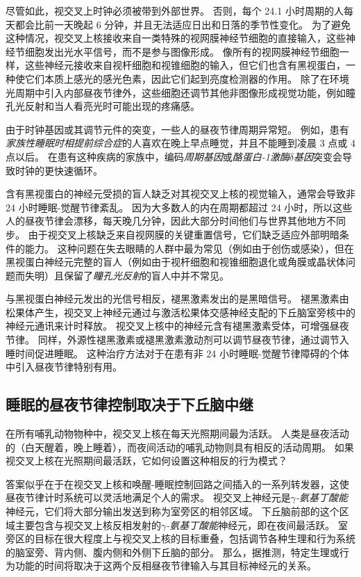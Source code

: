 尽管如此，视交叉上时钟必须被带到外部世界。
否则，每个 24.1 小时周期的人每天都会比前一天晚起 6 分钟，并且无法适应日出和日落的季节性变化。
为了避免这种情况，视交叉上核接收来自一类特殊的视网膜神经节细胞的直接输入，这些神经节细胞发出光水平信号，而不是参与图像形成。
像所有的视网膜神经节细胞一样，这些神经元接收来自视杆细胞和视锥细胞的输入，但它们也含有黑视蛋白，一种使它们本质上感光的感光色素，因此它们起到亮度检测器的作用。
除了在环境光周期中引入内部昼夜节律外，这些细胞还调节其他非图像形成视觉功能，例如瞳孔光反射和当人看亮光时可能出现的疼痛感。


由于时钟基因或其调节元件的突变，一些人的昼夜节律周期异常短。
例如，患有\textit{家族性睡眠时相提前综合症}的人喜欢在晚上早点睡觉，并且不能睡到凌晨 3 点或 4 点以后。
在患有这种疾病的家族中，编码\textit{周期基因}或\textit{酪蛋白-1激酶$\delta$基因}突变会导致时钟的更快速循环。


含有黑视蛋白的神经元受损的盲人缺乏对其视交叉上核的视觉输入，通常会导致非 24 小时睡眠-觉醒节律紊乱。
因为大多数人的内在周期都超过 24 小时，所以这些人的昼夜节律会漂移，每天晚几分钟，因此大部分时间他们与世界其他地方不同步。
由于视交叉上核缺乏来自视网膜的关键重置信号，它们缺乏适应外部明暗条件的能力。
这种问题在失去眼睛的人群中最为常见（例如由于创伤或感染），但在黑视蛋白神经元完整的盲人（例如由于视杆细胞和视锥细胞退化或角膜或晶状体问题而失明）且保留了\textit{瞳孔光反射}的盲人中并不常见。


与黑视蛋白神经元发出的光信号相反，褪黑激素发出的是黑暗信号。
褪黑激素由松果体产生，视交叉上神经元通过与激活松果体交感神经支配的下丘脑室旁核中的神经元通讯来计时释放。
视交叉上核中的神经元含有褪黑激素受体，可增强昼夜节律。
同样，外源性褪黑激素或褪黑激素激动剂可以调节昼夜节律，通过调节入睡时间促进睡眠。
这种治疗方法对于在患有非 24 小时睡眠-觉醒节律障碍的个体中引入昼夜节律特别有用。



\subsection{睡眠的昼夜节律控制取决于下丘脑中继}

在所有哺乳动物物种中，视交叉上核在每天光照期间最为活跃。
人类是昼夜活动的（白天醒着，晚上睡着），而夜间活动的哺乳动物则具有相反的活动周期。
如果视交叉上核在光照期间最活跃，它如何设置这种相反的行为模式？


答案似乎在于在视交叉上核和唤醒-睡眠控制回路之间插入的一系列转发器，这使昼夜节律计时系统可以灵活地满足个人的需求。
视交叉上神经元是\textit{$\gamma$-氨基丁酸能}神经元，它们将大部分输出发送到称为室旁区的相邻区域。
下丘脑前部的这个区域主要包含与视交叉上核反相发射的\textit{$\gamma$-氨基丁酸能}神经元，即在夜间最活跃。
室旁区的目标在很大程度上与视交叉上核的目标重叠，包括调节各种生理和行为系统的脑室旁、背内侧、腹内侧和外侧下丘脑的部分。
那么，据推测，特定生理或行为功能的时间将取决于这两个反相昼夜节律输入与其目标神经元的关系。


